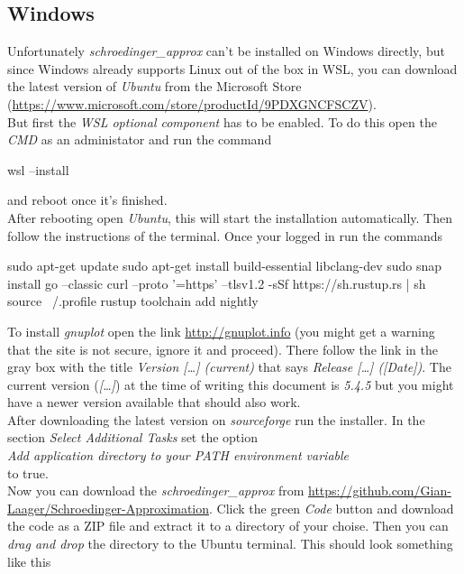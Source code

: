 \documentclass[11pt,DIV=10,final]{scrreprt} %
\begin{document}
\subsection{Windows}
Unfortunately \emph{schroedinger\_approx} can't be installed on Windows directly, but since
Windows already supports Linux out of the box in WSL, you can download the latest version of
\emph{Ubuntu} from the Microsoft Store (\url{https://www.microsoft.com/store/productId/9PDXGNCFSCZV}).
\\[3ex]
But first the \emph{WSL optional component} has to be enabled. To do this open the \emph{CMD}
as an administator and run the command
\begin{bashcode}
wsl --install
\end{bashcode}
and reboot once it's finished.
\\[3ex]
After rebooting open \emph{Ubuntu}, this will start the installation automatically. Then
follow the instructions of the terminal. Once your logged in run the commands
\begin{bashcode}
sudo apt-get update
sudo apt-get install build-essential libclang-dev
sudo snap install go --classic
curl --proto '=https' --tlsv1.2 -sSf https://sh.rustup.rs | sh
source ~/.profile
rustup toolchain add nightly
\end{bashcode}
\vspace*{3ex}
To install \emph{gnuplot} open the link
\url{http://gnuplot.info} (you might get a warning that the site is not secure, ignore it and
proceed). There follow the link in the gray box with the title
\emph{Version [\dots] (current)} that says \emph{Release [\dots] ([Date])}. The current
version (\emph{[\dots]}) at the time of writing this document is \emph{5.4.5} but you might
have a newer version available that should also work.
\\[3ex]
After downloading the latest version on \emph{sourceforge} run the installer. In the section
\emph{Select Additional Tasks} set the option \\
\hspace*{3ex}\emph{Add application directory to your PATH environment variable} \\
to true.
\\[3ex]
Now you can download the \emph{schroedinger\_approx} from \url{https://github.com/Gian-Laager/Schroedinger-Approximation}.
Click the green \emph{Code} button and download the code as a ZIP file and extract it to a directory of your choise.
Then you can \emph{drag and drop} the directory to the Ubuntu terminal. This should look something like this
\end{document}
